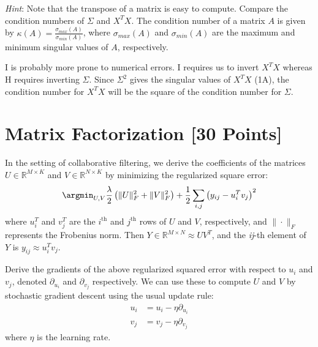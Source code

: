 \textit{Hint}: Note that the transpose of a matrix is easy to compute. Compare the condition numbers of $\Sigma$ and $X^T X$. The condition number of a matrix $A$ is given by $\kappa(A) = \frac{\sigma_{max}(A)}{\sigma_{min}(A)}$, where $\sigma_{max}(A)$ and $\sigma_{min}(A)$ are the maximum and minimum singular values of $A$, respectively.

\begin{solution}
	I is probably more prone to numerical errors.
	I requires us to invert $X^T X$ whereas H requires inverting $\Sigma$.
	Since $\Sigma^2$ gives the singular values of $X^T X$ (1A), the condition number for $X^T X$ will be the square of the condition number for $\Sigma$.
\end{solution}


\newpage
\section{Matrix Factorization [30 Points]}

In the setting of collaborative filtering, we derive the coefficients of the matrices $U \in \mathbb{R}^{M \times K}$ and $V \in \mathbb{R}^{N \times K}$ by minimizing the regularized square error:
$$\argmin_{U,V} \frac{\lambda}{2} \left( \|U\|_F^2 + \|V\|^2_F \right) + \frac{1}{2}\sum_{i,j} \left( y_{ij} - u_i^Tv_j\right)^2$$
where $u_i^T$ and $v_j^T$ are the $i^{\text{th}}$ and $j^{\text{th}}$ rows of $U$ and $V$, respectively, and $\|\cdot\|_F$ represents the Frobenius norm. Then $Y \in \mathbb{R}^{M \times N} \approx UV^T$, and the \textit{ij}-th element of $Y$ is $y_{ij} \approx u_i^Tv_j$.

\problem[5]Derive the gradients of the above regularized squared error with respect to $u_i$ and $v_j$, denoted $\partial_{u_i}$ and $\partial_{v_j}$ respectively.  We can use these to compute $U$ and $V$ by stochastic gradient descent using the usual update rule: 
\begin{align*}
u_i &= u_i - \eta \partial_{u_i} \\
v_j &= v_j - \eta \partial_{v_j}
\end{align*}
where $\eta$ is the learning rate.

